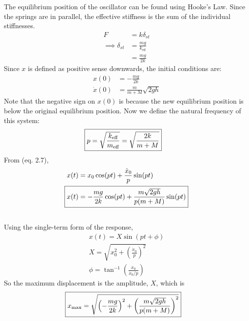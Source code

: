 The equilibrium position of the oscillator can be found using Hooke's Law. Since the springs are in parallel, the effective stiffness is the sum of the individual stiffnesses.
\begin{align*}
    F &= k \delta_{st} \\
    \implies \delta_{st} &= \frac{mg}{k_{\text{eff}}} \\
    &= \frac{mg}{2k}
\end{align*}
Since $x$ is defined as positive sense downwards, the initial conditions are:
\begin{align*}
    x(0) &= -\frac{mg}{2k} \\
    \dot{x}(0) &= \frac{m}{m + M} \sqrt{2 g h}
\end{align*}
Note that the negative sign on $x(0)$ is because the new equilibrium position is below the original equilibrium position. Now we define the natural frequency of this system:
\begin{align*}
    \Aboxed{p = \sqrt{\frac{k_{\text{eff}}}{m_{\text{eff}}}} = \sqrt{\frac{2k}{m + M}}}
\end{align*}
From (eq. 2.7), 
\begin{align*}
    x(t) &= x_0 \cos (pt) + \frac{\dot{x}_0}{p} \sin (pt) \\
    \Aboxed{x(t) &= -\frac{mg}{2k} \cos (pt) + \frac{m\sqrt{2gh}}{p(m + M)} \sin (pt)}
\end{align*}

\subsection{}
Using the single-term form of the response, 
\begin{gather*}
    x(t) = X \sin (pt + \phi) \\
    X = \sqrt{x_0^2 + \left(\frac{\dot{x}_0}{p}\right)^2} \\
    \phi = \tan^{-1} \left(\frac{x_0}{\dot{x}_0 / p}\right)
\end{gather*}
So the maximum displacement is the amplitude, $X$, which is
\begin{align*}
    \Aboxed{x_{\text{max}} &= \sqrt{\left(-\frac{mg}{2k}\right)^2 + \left(\frac{m\sqrt{2gh}}{p(m + M)}\right)^2}}
\end{align*}